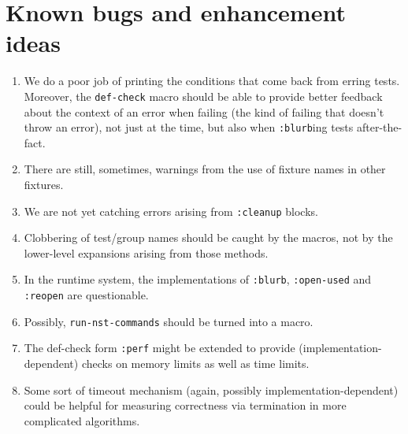\documentclass{article}
\begin{document}
\section{Known bugs and enhancement ideas}
\begin{enumerate}
\item We do a poor job of printing the conditions that come back from
  erring tests.  Moreover, the
  \texttt{def-check} macro should
  be able to provide better feedback about the context of an error
  when failing (the kind of failing that doesn't throw an error), not
  just at the time, but also when
  \texttt{:blurb}ing tests
  after-the-fact.
\item There are still, sometimes, warnings from the use of fixture
  names in other fixtures.
\item We are not yet catching errors arising from
  \texttt{:cleanup} blocks.
\item Clobbering of test/group names should be caught by the macros,
  not by the lower-level expansions arising from those methods.
\item In the runtime system, the implementations of
  \texttt{:blurb},
  \texttt{:open-used} and
  \texttt{:reopen} are questionable.
\item Possibly,
  \texttt{run-nst-commands}
  should be turned into a macro.
\item The def-check form \texttt{:perf} might be extended to provide
  (implementation-dependent) checks on memory limits as well as time
  limits.
\item Some sort of timeout mechanism (again, possibly
  implementation-dependent) could be helpful for measuring correctness
  via termination in more complicated algorithms.
\end{enumerate}

\appendix
\end{document}

